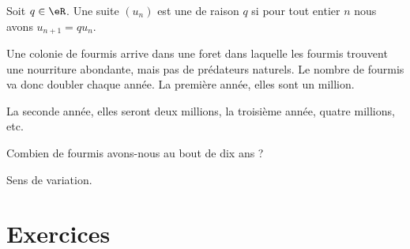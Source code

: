
\begin{definition}
    Soit \( q\in \eR\). Une suite \( (u_n)\) est une  de raison \( q\) si pour tout entier \( n\) nous avons \( u_{n+1}=qu_n\).
\end{definition}

\begin{example}
    Une colonie de fourmis arrive dans une foret dans laquelle les fourmis trouvent une nourriture abondante, mais pas de prédateurs naturels. Le nombre de fourmis va donc doubler chaque année. La première année, elles sont un million.

    La seconde année, elles seront deux millions, la troisième année, quatre millions, etc.

    Combien de fourmis avons-nous au bout de dix ans ?

\end{example}

\begin{Aretenir}
    Sens de variation.
    \begin{enumerate}
    \end{enumerate}
\end{Aretenir}

\section{Exercices}


